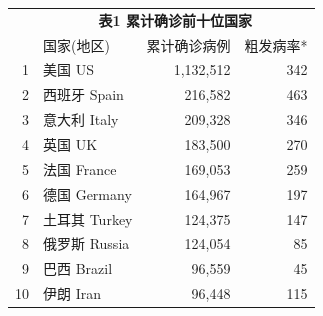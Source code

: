 \documentclass[
]{article}
\begin{document}
\begin{table}[H]
    \centering \begin{table}[H]
\centering\begingroup\fontsize{20}{22}\selectfont

\begin{tabular}{rlrr}
\toprule
\multicolumn{0}{c}{\textbf{ }} & \multicolumn{3}{c}{\textbf{表1 累计确诊前十位国家}} \\
  & 国家(地区) & 累计确诊病例 & 粗发病率*\\
\midrule
\rowcolor{gray!6}  1 & 美国 US & 1,132,512 & 342\\
2 & 西班牙 Spain & 216,582 & 463\\
\rowcolor{gray!6}  3 & 意大利 Italy & 209,328 & 346\\
4 & 英国 UK & 183,500 & 270\\
\rowcolor{gray!6}  5 & 法国 France & 169,053 & 259\\
6 & 德国 Germany & 164,967 & 197\\
\rowcolor{gray!6}  7 & 土耳其 Turkey & 124,375 & 147\\
8 & 俄罗斯 Russia & 124,054 & 85\\
\rowcolor{gray!6}  9 & 巴西 Brazil & 96,559 & 45\\
10 & 伊朗 Iran & 96,448 & 115\\
\bottomrule
\end{tabular}
\endgroup{}
\end{table} \end{table}\begin{table}[H]
    \centering \begin{table}[H]
\centering\begingroup\fontsize{20}{22}\selectfont


\end{table}
\end{table}
\end{document}
